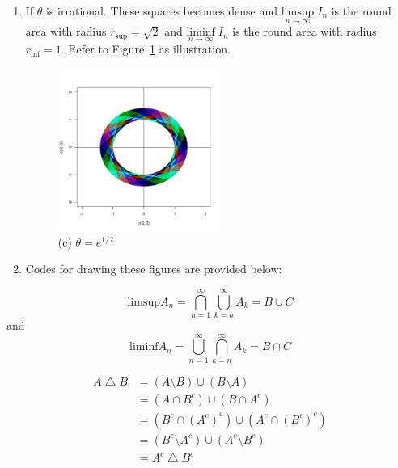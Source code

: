 \begin{list}{1.9.}{}
\begin{enumerate}
  \item If $\theta$ is irrational. These squares becomes dense and $ \underset{n\to\infty}{\mathrm{limsup}}\;I_n$ is the round area with radius $r_{\mathrm{sup}}= \sqrt{2}$ and $ \underset{n\to\infty}{\mathrm{liminf}}\;I_n$ is the round area with radius $r_{\mathrm{inf}} = 1$. Refer to Figure~\ref{fig:1.9.7.c} as illustration.
    \begin{figure}[htbp]
      \centering
      \includegraphics[width=0.5\textwidth]{./Figures/1_9_7_c.pdf}
      \caption{(c) $\theta = e^{1/2}$}
      \label{fig:1.9.7.c}
    \end{figure}
  \item Codes for drawing these figures are provided below:
    
  \end{enumerate}

  
\item
  \[
    \mathrm{limsup}A_n = \bigcap\limits_{n=1}^\infty\bigcup\limits_{k=n}^\infty A_k = B \cup C
  \]
  and
  \[
    \mathrm{liminf}A_n = \bigcup\limits_{n=1}^\infty\bigcap\limits_{k=n}^\infty A_k = B \cap C
  \]

  
\item
  \[
    \begin{aligned}
      A \bigtriangleup B &= \left(A \setminus B\right) \cup \left(B \setminus A\right)    \\
      & = \left(A \cap B^c \right) \cup \left(B \cap A^c \right)    \\
      & = \left(B^c \cap \left(A^c\right)^c \right) \cup \left(A^c \cap \left(B^c\right)^c \right)    \\
      & = \left(B^c \setminus A^c \right) \cup \left(A^c \setminus B^c \right)    \\
      & = A^c \bigtriangleup B^c
    \end{aligned}
  \]


\end{list}
